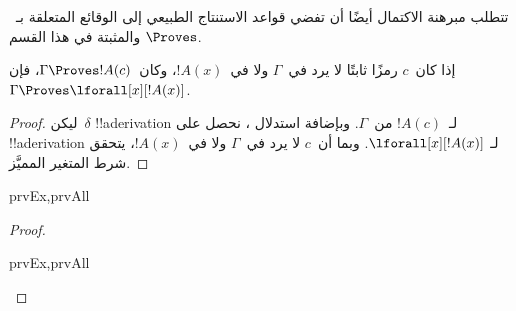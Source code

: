 \documentclass[../../../include/open-logic-section]{subfiles}
\begin{document}


\begin{explain}
  تتطلب مبرهنة الاكتمال أيضًا أن تفضي قواعد الاستنتاج الطبيعي إلى
  الوقائع المتعلقة بـ~$\Proves$ والمثبتة في هذا القسم.
\end{explain}

\begin{thm}
 إذا كان~$c$ رمزًا ثابتًا لا يرد
في~$\Gamma$ ولا في~$!A(x)$، وكان~$\Gamma \Proves !A(c)$، فإن
$\Gamma \Proves \lforall[x][!A(x)]$.
\end{thm}

\begin{proof}
ليكن~$\delta$ !!a{derivation} لـ~$!A(c)$ من~$\Gamma$. وبإضافة استدلال
\Intro{\lforall}، نحصل على !!a{derivation} لـ
$\lforall[x][!A(x)]$. وبما أن~$c$ لا يرد في~$\Gamma$ ولا في~$!A(x)$،
يتحقق شرط المتغير المميَّز.
\end{proof}

\begin{prop}
\begin{tagenumerate}{prvEx,prvAll}

\end{tagenumerate}
\end{prop}

\begin{proof}
\begin{tagenumerate}{prvEx,prvAll}

\end{tagenumerate}
\end{proof}
\end{document}

